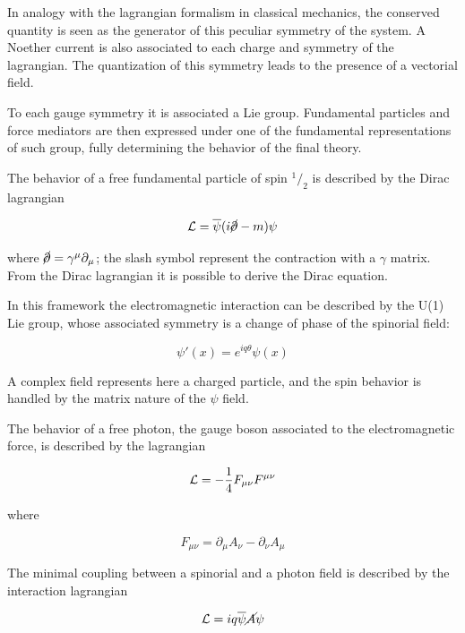 In analogy with the lagrangian formalism in classical mechanics, the conserved quantity is seen as the generator of this peculiar symmetry of the system. A Noether current is also associated to each charge and symmetry of the lagrangian. The quantization of this symmetry leads to the presence of a vectorial field. 

To each gauge symmetry it is associated a Lie group. Fundamental particles and force mediators are then expressed under one of the fundamental representations of such group, fully determining the behavior of the final theory.

The behavior of a free fundamental particle of spin $^1/_2$ is described by the Dirac lagrangian

\begin{equation}
\mathcal{L}=\overline{\psi}(i\cancel{\partial}-m)\psi
\label{eq:dirac_lag}
\end{equation}

where $\cancel{\partial} = \gamma^\mu \partial_\mu$; the slash symbol represent the contraction with a $\gamma$ matrix. From the Dirac lagrangian it is possible to derive the Dirac equation.

In this framework the electromagnetic interaction can be described by the U(1) Lie group, whose associated symmetry is a change of phase of the spinorial field: %

\begin{equation}
\psi'(x) = e^{iq\theta}\psi(x)
\end{equation}

A complex field represents here a charged particle, and the spin behavior is handled by the matrix nature of the $\psi$ field.

The behavior of a free photon, the gauge boson associated to the electromagnetic force, is described by the lagrangian

\begin{equation}
\mathcal{L} = -\frac{1}{4}F_{\mu\nu}F^{\mu\nu}
\end{equation}

where

\begin{equation}
 F_{\mu\nu} =\partial_{\mu}A_{\nu}-\partial_{\nu}A_{\mu}
\end{equation}

The minimal coupling between a spinorial and a photon field is described by the interaction lagrangian

\begin{equation}
\mathcal{L} = iq \overline{\psi} \cancel{A} \psi 
\end{equation}

